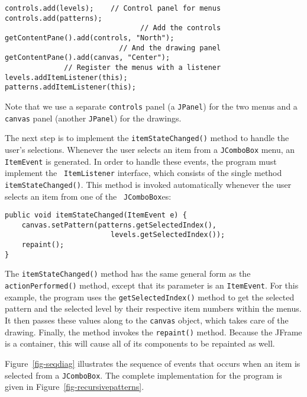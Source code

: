\begin{jjjlisting}
\begin{lstlisting}
controls.add(levels);    // Control panel for menus
controls.add(patterns);
                                // Add the controls
getContentPane().add(controls, "North"); 
                           // And the drawing panel
getContentPane().add(canvas, "Center");  
              // Register the menus with a listener
levels.addItemListener(this);  
patterns.addItemListener(this);
\end{lstlisting}
\end{jjjlisting}

\noindent Note that we use a separate {\tt controls} panel (a {\tt JPanel})
for the two menus and a {\tt canvas} panel (another {\tt JPanel}) for
the drawings.

The next step is to implement the {\tt itemStateChanged()} method to
handle the user's selections.  Whenever the user selects an item from
a {\tt JCombo\-Box} menu, an {\tt ItemEvent} is generated.  In order
to handle these events, the program must implement the {\tt
ItemListener} interface, which consists
of the single method {\tt itemStateChanged()}. This method is invoked
automatically whenever the user selects an item from one of the {\tt
JComboBox}es:

\begin{jjjlisting}
\begin{lstlisting}
public void itemStateChanged(ItemEvent e) {
    canvas.setPattern(patterns.getSelectedIndex(), 
                         levels.getSelectedIndex());
    repaint();
}
\end{lstlisting}
\end{jjjlisting}

\noindent The {\tt itemStateChanged()} method has the same general
form as the {\tt actionPerformed()} method, except that its parameter
is an \mbox{\tt ItemEvent}.  For this example, the program uses the
{\tt get\-Selected\-Index()} method to get the selected pattern and the
selected level by their respective item numbers within the menus.  It
then passes these values along to the {\tt canvas} object, which takes
care of the drawing.  Finally, the method invokes the {\tt repaint()}
method.  Because the JFrame is a container, this will cause all of its
components to be repainted as well.  

Figure~\ref{fig-seqdiag} illustrates the sequence of events that
occurs when an item is selected from a {\tt JComboBox}.  The complete
implementation for the program is given in
Figure~\ref{fig-recursivepatterns}.

